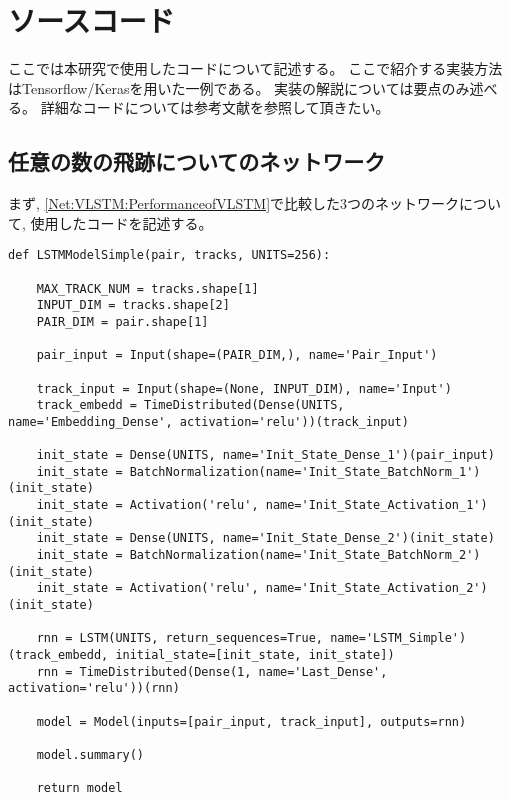 
\appendix 

\chapter{ソースコード} \label{sec:Code}

ここでは本研究で使用したコードについて記述する。
ここで紹介する実装方法はTensorflow/Kerasを用いた一例である。
実装の解説については要点のみ述べる。
詳細なコードについては参考文献\cite{GitHubGotoK}を参照して頂きたい。

\section{任意の数の飛跡についてのネットワーク} \label{sec:CodeVLSTM}

まず, \ref{Net:VLSTM:PerformanceofVLSTM}で比較した3つのネットワークについて, 使用したコードを記述する。

\begin{lstlisting}[caption=標準的なLSTM, label=SimpleLSTM]
def LSTMModelSimple(pair, tracks, UNITS=256):

    MAX_TRACK_NUM = tracks.shape[1]
    INPUT_DIM = tracks.shape[2]
    PAIR_DIM = pair.shape[1]

    pair_input = Input(shape=(PAIR_DIM,), name='Pair_Input')

    track_input = Input(shape=(None, INPUT_DIM), name='Input')
    track_embedd = TimeDistributed(Dense(UNITS, name='Embedding_Dense', activation='relu'))(track_input)

    init_state = Dense(UNITS, name='Init_State_Dense_1')(pair_input)
    init_state = BatchNormalization(name='Init_State_BatchNorm_1')(init_state)
    init_state = Activation('relu', name='Init_State_Activation_1')(init_state)
    init_state = Dense(UNITS, name='Init_State_Dense_2')(init_state)
    init_state = BatchNormalization(name='Init_State_BatchNorm_2')(init_state)
    init_state = Activation('relu', name='Init_State_Activation_2')(init_state)

    rnn = LSTM(UNITS, return_sequences=True, name='LSTM_Simple')(track_embedd, initial_state=[init_state, init_state])
    rnn = TimeDistributed(Dense(1, name='Last_Dense', activation='relu'))(rnn)
    
    model = Model(inputs=[pair_input, track_input], outputs=rnn)

    model.summary()

    return model
\end{lstlisting}

